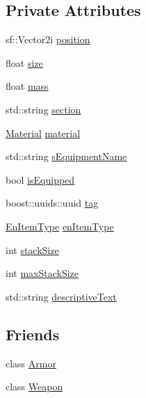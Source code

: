\subsection*{Private Attributes}
\begin{DoxyCompactItemize}
\item 
sf\+::\+Vector2i \mbox{\hyperlink{class_item_ad1c1601358e5c56063390327e0d86ce1}{position}}
\item 
float \mbox{\hyperlink{class_item_af6193bebd888e699303f91bee96d9f16}{size}}
\item 
float \mbox{\hyperlink{class_item_a59f0500b0a1a2c5e6590deb7ff58db7b}{mass}}
\item 
std\+::string \mbox{\hyperlink{class_item_a23ee78e35c27520fce1ddfe2c56f88a0}{section}}
\item 
\mbox{\hyperlink{class_material}{Material}} \mbox{\hyperlink{class_item_a6b060c7156a9089e58869c8c4776bf4d}{material}}
\item 
std\+::string \mbox{\hyperlink{class_item_ab551fd7ec7c75a6d125cad56fe84b30a}{s\+Equipment\+Name}}
\item 
bool \mbox{\hyperlink{class_item_a47a03cb11d41796494640d62f4d6b9d2}{is\+Equipped}}
\item 
boost\+::uuids\+::uuid \mbox{\hyperlink{class_item_ae25a4fa73976dabda3d4df6cf16fdaf1}{tag}}
\item 
\mbox{\hyperlink{_equipment_8hpp_a3c7fe24829a0b210a1a4d36e29ac01c6}{En\+Item\+Type}} \mbox{\hyperlink{class_item_a132d392fc3cd4c7dfa06ceaa0888a491}{en\+Item\+Type}}
\item 
int \mbox{\hyperlink{class_item_a0e80a8ff6b74d6a2ecbd9a972e7df69a}{stack\+Size}}
\item 
int \mbox{\hyperlink{class_item_a21048ebf5f1893ed429657863c622288}{max\+Stack\+Size}}
\item 
std\+::string \mbox{\hyperlink{class_item_a337c41fb4f1ac4b9ab69266722d9afac}{descriptive\+Text}}
\end{DoxyCompactItemize}
\subsection*{Friends}
\begin{DoxyCompactItemize}
\item 
class \mbox{\hyperlink{class_item_aacd78ed1db38c3d74aa80233c16b3e9c}{Armor}}
\item 
class \mbox{\hyperlink{class_item_ab356dbee0f1e915287732c65e8ef61e1}{Weapon}}
\end{DoxyCompactItemize}


